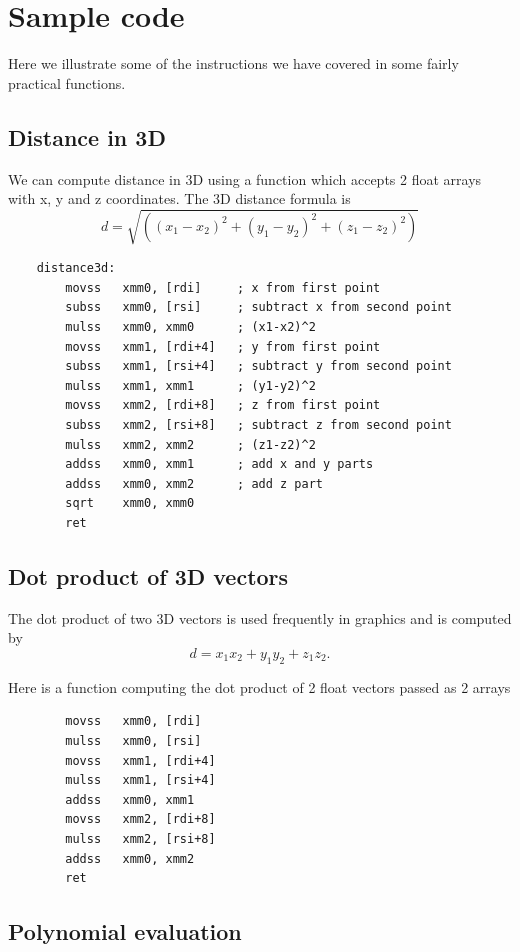 \documentclass[11pt,b5paper]{book}
\begin{document}
\section{Sample code}

Here we illustrate some of the instructions we have covered in some fairly practical functions.

\subsection{Distance in 3D}

We can compute distance in 3D using a function which accepts 2 float arrays with x, y and z coordinates.
The 3D distance formula is
$$d = \sqrt{((x_1-x_2)^2+(y_1-y_2)^2+(z_1-z_2)^2)}$$

\begin{verbatim}
    distance3d:
        movss   xmm0, [rdi]     ; x from first point
        subss   xmm0, [rsi]     ; subtract x from second point
        mulss   xmm0, xmm0      ; (x1-x2)^2
        movss   xmm1, [rdi+4]   ; y from first point
        subss   xmm1, [rsi+4]   ; subtract y from second point
        mulss   xmm1, xmm1      ; (y1-y2)^2
        movss   xmm2, [rdi+8]   ; z from first point
        subss   xmm2, [rsi+8]   ; subtract z from second point
        mulss   xmm2, xmm2      ; (z1-z2)^2
        addss   xmm0, xmm1      ; add x and y parts
        addss   xmm0, xmm2      ; add z part
        sqrt    xmm0, xmm0
        ret
\end{verbatim}

\subsection{Dot product of 3D vectors}

The dot product of two 3D vectors is used frequently in graphics and is computed by
$$d = x_1x_2 + y_1y_2 + z_1z_2.$$

Here is a function computing the dot product of 2 float vectors passed as 2 arrays
\begin{verbatim}
        movss   xmm0, [rdi]
        mulss   xmm0, [rsi]
        movss   xmm1, [rdi+4]
        mulss   xmm1, [rsi+4]
        addss   xmm0, xmm1
        movss   xmm2, [rdi+8]
        mulss   xmm2, [rsi+8]
        addss   xmm0, xmm2
        ret
\end{verbatim}

\subsection{Polynomial evaluation}
\end{document}
